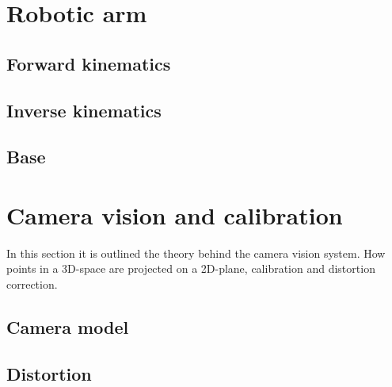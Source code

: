 \section*{Robotic arm}
\subsection*{Forward kinematics}
\subsection*{Inverse kinematics}
\subsection*{Base}

\section*{Camera vision and calibration}
In this section it is outlined the theory behind the camera vision system. 
How points in a 3D-space are projected on a 2D-plane, calibration and distortion correction. 
\subsection*{Camera model}
\subsection*{Distortion}